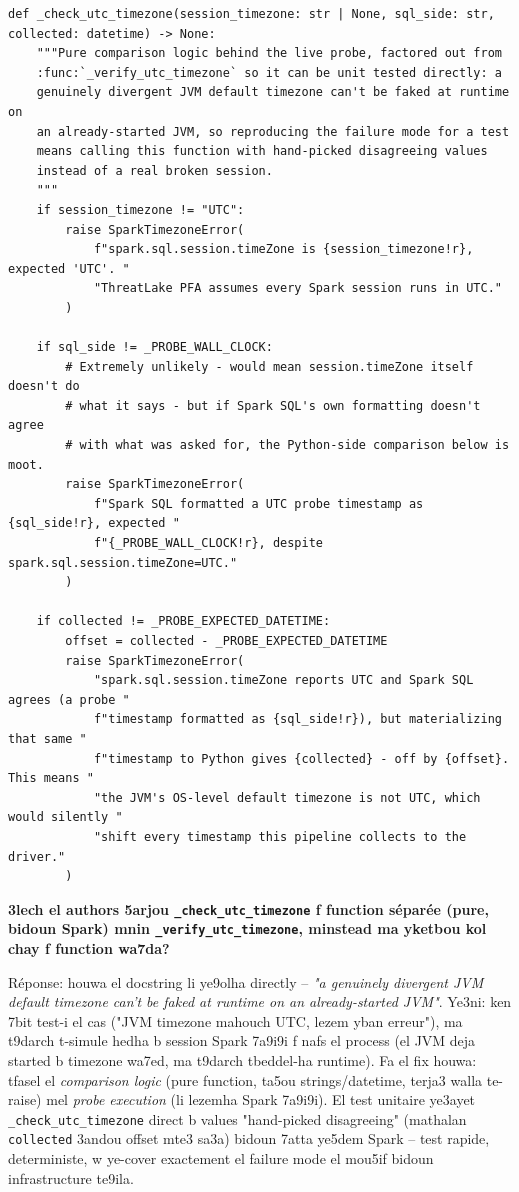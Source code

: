 \documentclass[11pt,a4paper]{report}
\DeclareRobustCommand{\code}[1]{\texttt{#1}}
\begin{document}
\begin{lstlisting}[style=pystyle]
def _check_utc_timezone(session_timezone: str | None, sql_side: str, collected: datetime) -> None:
    """Pure comparison logic behind the live probe, factored out from
    :func:`_verify_utc_timezone` so it can be unit tested directly: a
    genuinely divergent JVM default timezone can't be faked at runtime on
    an already-started JVM, so reproducing the failure mode for a test
    means calling this function with hand-picked disagreeing values
    instead of a real broken session.
    """
    if session_timezone != "UTC":
        raise SparkTimezoneError(
            f"spark.sql.session.timeZone is {session_timezone!r}, expected 'UTC'. "
            "ThreatLake PFA assumes every Spark session runs in UTC."
        )

    if sql_side != _PROBE_WALL_CLOCK:
        # Extremely unlikely - would mean session.timeZone itself doesn't do
        # what it says - but if Spark SQL's own formatting doesn't agree
        # with what was asked for, the Python-side comparison below is moot.
        raise SparkTimezoneError(
            f"Spark SQL formatted a UTC probe timestamp as {sql_side!r}, expected "
            f"{_PROBE_WALL_CLOCK!r}, despite spark.sql.session.timeZone=UTC."
        )

    if collected != _PROBE_EXPECTED_DATETIME:
        offset = collected - _PROBE_EXPECTED_DATETIME
        raise SparkTimezoneError(
            "spark.sql.session.timeZone reports UTC and Spark SQL agrees (a probe "
            f"timestamp formatted as {sql_side!r}), but materializing that same "
            f"timestamp to Python gives {collected} - off by {offset}. This means "
            "the JVM's OS-level default timezone is not UTC, which would silently "
            "shift every timestamp this pipeline collects to the driver."
        )
\end{lstlisting}

\begin{soual}
\textbf{3lech el authors 5arjou \code{\_check\_utc\_timezone} f function
séparée (pure, bidoun Spark) mnin \code{\_verify\_utc\_timezone}, minstead
ma yketbou kol chay f function wa7da?}

Réponse: houwa el docstring li ye9olha directly -- \emph{"a genuinely
divergent JVM default timezone can't be faked at runtime on an
already-started JVM"}. Ye3ni: ken 7bit test-i el cas ("JVM timezone
mahouch UTC, lezem yban erreur"), ma t9darch t-simule hedha b session Spark
7a9i9i f nafs el process (el JVM deja started b timezone wa7ed, ma
t9darch tbeddel-ha runtime). Fa el fix houwa: tfasel el \emph{comparison
logic} (pure function, ta5ou strings/datetime, terja3 walla te-raise) mel
\emph{probe execution} (li lezemha Spark 7a9i9i). El test unitaire ye3ayet
\code{\_check\_utc\_timezone} direct b values "hand-picked disagreeing"
(mathalan \code{collected} 3andou offset mte3 sa3a) bidoun 7atta ye5dem
Spark -- test rapide, deterministe, w ye-cover exactement el failure mode
el mou5if bidoun infrastructure te9ila.
\end{soual}
\end{document}
